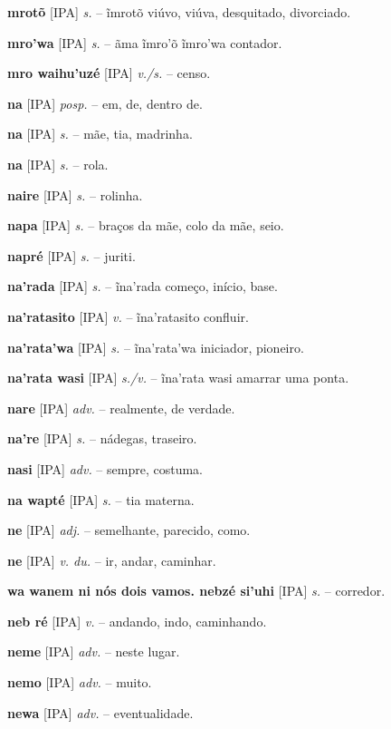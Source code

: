 \textbf{mrotõ} [IPA] \textit{s.} -- ĩmrotõ viúvo, viúva, desquitado, divorciado.

\textbf{mro'wa} [IPA] \textit{s.} -- ãma ĩmro'õ ĩmro'wa contador.

\textbf{mro waihu'uzé} [IPA] \textit{v./s.} -- censo.   %

\textbf{na} [IPA] \textit{posp.} -- em, de, dentro de.

\textbf{na} [IPA] \textit{s.} -- mãe, tia, madrinha.

\textbf{na} [IPA] \textit{s.} -- rola.

\textbf{naire} [IPA] \textit{s.} -- rolinha.

\textbf{napa} [IPA] \textit{s.} -- braços da mãe, colo da mãe, seio.

\textbf{napré} [IPA] \textit{s.} -- juriti.

\textbf{na'rada} [IPA] \textit{s.} -- ĩna'rada começo, início, base.

\textbf{na'ratasito} [IPA] \textit{v.} -- ĩna'ratasito confluir.

\textbf{na'rata'wa} [IPA] \textit{s.} -- ĩna'rata'wa iniciador, pioneiro.

\textbf{na'rata wasi} [IPA] \textit{s./v.} -- ĩna'rata wasi amarrar uma ponta.

\textbf{nare} [IPA] \textit{adv.} -- realmente, de verdade.

\textbf{na're} [IPA] \textit{s.} -- nádegas, traseiro.

\textbf{nasi} [IPA] \textit{adv.} -- sempre, costuma.

\textbf{na wapté} [IPA] \textit{s.} -- tia materna.

\textbf{ne} [IPA] \textit{adj.} -- semelhante, parecido, como.

\textbf{ne} [IPA] \textit{v. du.} -- ir, andar, caminhar.

\textbf{wa wanem ni nós dois vamos. nebzé si'uhi} [IPA] \textit{s.} -- corredor.

\textbf{neb ré} [IPA] \textit{v.} -- andando, indo, caminhando.

\textbf{neme} [IPA] \textit{adv.} -- neste lugar.

\textbf{nemo} [IPA] \textit{adv.} -- muito.

\textbf{newa} [IPA] \textit{adv.} -- eventualidade.

